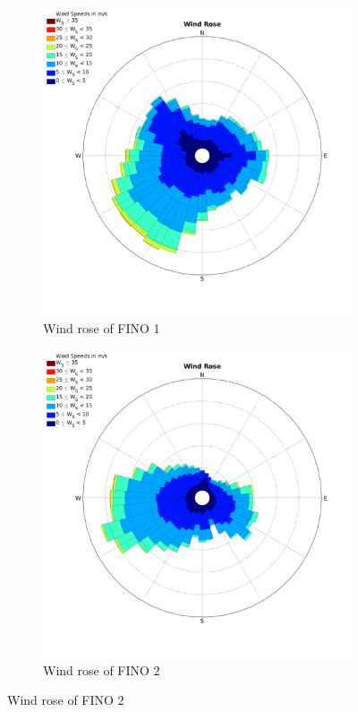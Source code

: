 \documentclass[10pt]{article}
\begin{document}
\begin{figure}[htb!]
\label{fig:WindRose1_valdidation}
\begin{subfigure}{0.5\textwidth}
  \centering
  \includegraphics[width=1\linewidth]{../figures/WindRose_Fino1.png}
  \caption{Wind rose of FINO 1}
  \label{fig:Windrose_Fino1}
\end{subfigure}
\begin{subfigure}{0.5\textwidth}
  \centering
  \includegraphics[width=1\linewidth]{../figures/WindRose_Fino2.png}
  \caption{Wind rose of FINO 2}
    \label{fig:Windrose_Fino2}
\end{subfigure}
\end{figure}
\end{document}
